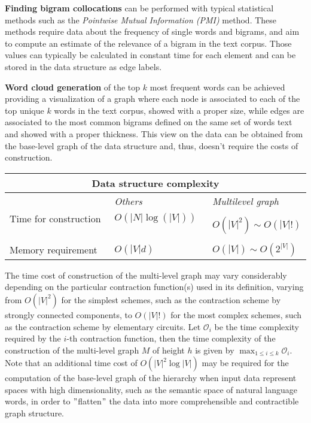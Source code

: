 \textbf{Finding bigram collocations} can be performed with typical statistical methods such as the \textit{Pointwise
Mutual Information (PMI)} method.
These methods require data about the frequency of single words and bigrams, and aim to compute an estimate of
the relevance of a bigram in the text corpus.
Those values can typically be calculated in constant time for each element and can be stored in the data structure
as edge labels. \newline

\textbf{Word cloud generation} of the top $k$ most frequent words can be achieved providing a visualization of a
graph where each node is associated to each of the top unique $k$ words in the text corpus, showed with a proper size,
while edges are associated to the most common bigrams defined on the same set of words text and showed with a proper
thickness.
This view on the data can be obtained from the base-level graph of the data structure and, thus, doesn't require the
costs of construction. \newline \newline

\begin{table}[hbt!]
    \begin{tabular}{|l|l|l|}        \hline
        \multicolumn{3}{|c|}{\textbf{Data structure complexity}} \\ [0.5ex]
        \hline
                                          & \textit{Others}           & \textit{Multilevel graph} \\ [0.5ex]
        \hline
        \large Time for construction     \,\,        &  \large $O(|N| \log(|V|))$    \,\,   &  \large $O(|V|^2) \sim O(|V|!)$ \\
        \hline
        \large Memory requirement                &  \large $O(|V| d)$               &  \large $O(|V|) \sim O(2^{|V|})$ \\
        \hline
    \end{tabular}\label{tab:table2}
\end{table}

The time cost of construction of the multi-level graph may vary considerably depending on the particular
contraction function(s) used in its definition, varying from $O(|V|^2)$ for the simplest schemes, such as the
contraction scheme by strongly connected components, to $O(|V|!)$ for the most complex schemes, such as the
contraction scheme by elementary circuits.
Let $\mathcal{O}_i$ be the time complexity required by the $i$-th contraction function, then the time complexity of the
construction of the multi-level graph $M$ of height $h$ is given by $\max_{1 \leq i \leq k}{\mathcal{O}_i}$. \newline
Note that an additional time cost of $O(|V|^2 \log{|V|})$ may be required for the computation of the base-level graph
of the hierarchy when input data represent spaces with high dimensionality, such as the semantic space of natural
language words, in order to \("\)flatten\("\) the data into more comprehensible and contractible graph structure. \newline


